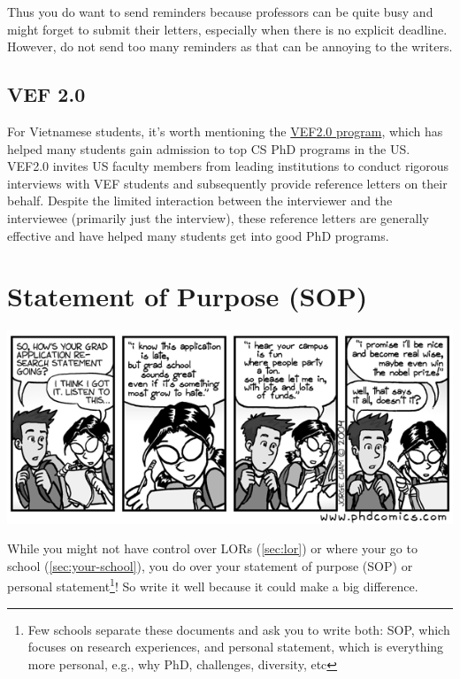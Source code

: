 \documentclass[oneside,11pt,dvipsnames]{book}
\begin{document}
Thus you do want to send reminders because professors can be quite busy and might forget to submit their letters, especially when there is no explicit deadline. However, do not send too many reminders as that can be annoying to the writers.





\subsection{VEF 2.0} For Vietnamese students, it's worth mentioning the \href{https://vef2.org/}{VEF2.0 program}, which has helped many students gain admission to top CS PhD programs in the US. VEF2.0 invites US faculty members from leading institutions to conduct rigorous interviews with VEF students and subsequently provide reference letters on their behalf. Despite the limited interaction between the interviewer and the interviewee (primarily just the interview), these reference letters are generally effective and have helped many students get into good PhD programs.

\section{Statement of Purpose (SOP)}\label{sec:research-statement}

\begin{center}
  \includegraphics[scale=0.5]{files/c2.png}
\end{center}

While you might not have control over LORs (\autoref{sec:lor}) or where your go to school (\autoref{sec:your-school}), you do over your
statement of purpose (SOP) or personal statement\footnote{Few schools separate these documents and ask you to write both: SOP, which focuses on research experiences, and personal statement, which is everything more personal, e.g., why PhD, challenges, diversity, etc}! So write it well because it could make a big difference.
\end{document}
